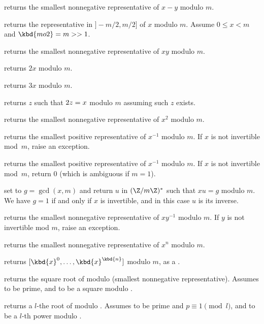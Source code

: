  returns the smallest
nonnegative representative of $x - y$ modulo $m$.

 returns the representative
in $]-m/2,m/2]$ of $x$ modulo $m$. Assume $0 \leq x < m$ and
$\kbd{mo2}  = m >> 1$.

 returns the smallest
nonnegative representative of $x y$ modulo $m$.

 returns $2x$ modulo $m$.

 returns $3x$ modulo $m$.

 returns $z$ such that $2\*z = x$ modulo
$m$ assuming such $z$ exists.

 returns the smallest nonnegative
representative of $x^2$ modulo $m$.

 returns the smallest
positive representative of $x^{-1}$ modulo $m$. If $x$ is not invertible
mod~$m$, raise an exception.

 returns the smallest
positive representative of $x^{-1}$ modulo $m$. If $x$ is not invertible
mod~$m$, return $0$ (which is ambiguous if $m=1$).

 set  to
$g = \gcd(x,m)$ and return $u$ in $(\Z/m\Z)^*$ such that $x u = g$ modulo $m$.
We have $g = 1$ if and only if $x$ is invertible, and in this case $u$
is its inverse.

 returns the smallest
nonnegative representative of $x y^{-1}$ modulo $m$. If $y$ is not invertible
mod $m$, raise an exception.

 returns the smallest
nonnegative representative of $x^n$ modulo $m$.

 returns
$[\kbd{x}^0, \dots, \kbd{x}^\kbd{n}]$ modulo $m$, as a .

 returns the square root of 
modulo  (smallest nonnegative representative). Assumes  to be
prime, and  to be a square modulo .

 returns a $l$-the root of 
modulo . Assumes  to be prime and $p \equiv 1 \pmod{l}$, and
 to be a $l$-th power modulo .


